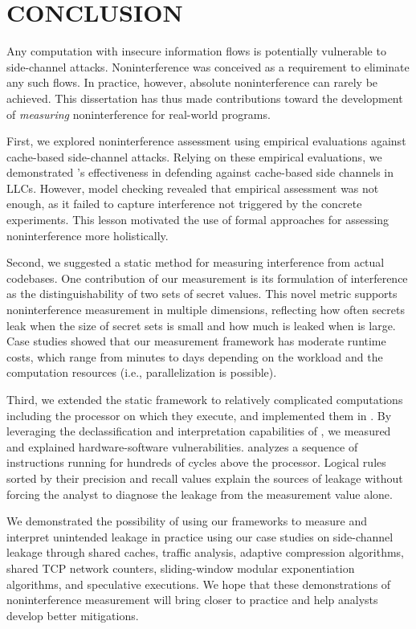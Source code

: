 \chapter{\uppercase{Conclusion}}
Any computation with insecure information flows is potentially
vulnerable to side-channel attacks.  Noninterference was conceived as
a requirement to eliminate any such flows.  In practice, however,
absolute noninterference can rarely be achieved.  This
dissertation has thus made contributions toward the development of
\textit{measuring} noninterference for real-world programs.

First, we explored noninterference assessment using
empirical evaluations against cache-based side-channel
attacks. Relying on these empirical evaluations, we demonstrated
\cachebar's effectiveness in defending against cache-based side
channels in \glspl{LLC}. However, model checking revealed that
empirical assessment was not enough, as it failed to capture
interference not triggered by the concrete experiments.  This lesson
motivated the use of formal approaches for assessing noninterference
more holistically.
\iffalse
Concretely,
when the copy-on-access transitions \accessed to \shared due to
timeout or \exclusive to the \shared due to copy merging, the attacker
still could \Reload to learn whether the victim used that memory page
if the those state transitions does not clear the victim's footprint
in cache.
\fi

Second, we suggested a static method for measuring interference from
actual codebases. One contribution of our measurement is its
formulation of interference as the distinguishability of two sets of
secret values.  This novel metric supports noninterference measurement
in multiple dimensions, reflecting how often secrets leak when the
size \secretsSetSize of secret sets is small and how much is leaked
when \secretsSetSize is large.  Case studies showed that our
measurement framework has moderate runtime costs, which range from
minutes to days depending on the workload and the computation
resources (i.e., parallelization is possible).

Third, we extended the static framework to relatively complicated
computations including the processor on which they execute, and
implemented them in \thirdsysname.  By leveraging the declassification
and interpretation capabilities of \thirdsysname, we measured and
explained hardware-software vulnerabilities. \thirdsysname analyzes a
sequence of instructions running for hundreds of cycles above the
\boom processor.  Logical rules sorted by their precision and recall
values explain the sources of leakage without forcing the analyst to
diagnose the leakage from the measurement value alone.

We demonstrated the possibility of using our frameworks to measure and
interpret unintended leakage in practice using our case studies on
side-channel leakage through shared caches, traffic analysis, adaptive
compression algorithms, shared TCP network counters, sliding-window
modular exponentiation algorithms, and speculative executions.  We
hope that these demonstrations of noninterference measurement will
bring  closer to practice and help analysts develop better
mitigations.
